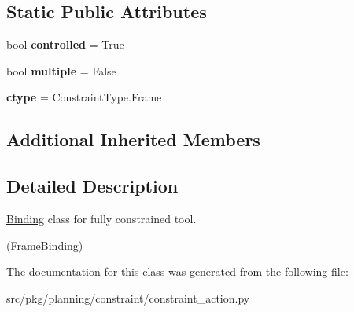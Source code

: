 \subsection*{Static Public Attributes}
\begin{DoxyCompactItemize}
\item 
\mbox{\label{classrnb-planning_1_1src_1_1pkg_1_1planning_1_1constraint_1_1constraint__action_1_1_framed_tool_aeae5a7884d94ce802cff43830df1700b}} 
bool {\bfseries controlled} = True
\item 
\mbox{\label{classrnb-planning_1_1src_1_1pkg_1_1planning_1_1constraint_1_1constraint__action_1_1_framed_tool_a7ba86c7509b81ce605bb36a948aa1fea}} 
bool {\bfseries multiple} = False
\item 
\mbox{\label{classrnb-planning_1_1src_1_1pkg_1_1planning_1_1constraint_1_1constraint__action_1_1_framed_tool_abc8857e997d6a17644a0dfe9f5affb19}} 
{\bfseries ctype} = Constraint\+Type.\+Frame
\end{DoxyCompactItemize}
\subsection*{Additional Inherited Members}


\subsection{Detailed Description}
\hyperlink{classrnb-planning_1_1src_1_1pkg_1_1planning_1_1constraint_1_1constraint__action_1_1_binding}{Binding} class for fully constrained tool. 

(\hyperlink{classrnb-planning_1_1src_1_1pkg_1_1planning_1_1constraint_1_1constraint__action_1_1_frame_binding}{Frame\+Binding}) 

The documentation for this class was generated from the following file\+:\begin{DoxyCompactItemize}
\item 
src/pkg/planning/constraint/constraint\+\_\+action.\+py\end{DoxyCompactItemize}
